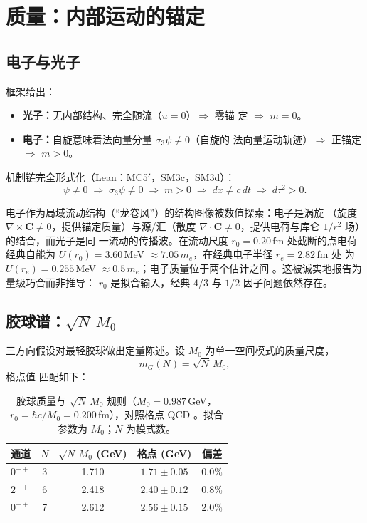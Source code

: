 \documentclass[aps,prd,preprint,superscriptaddress,amsmath,amssymb]{revtex4-2}
\begin{document}
\section{质量：内部运动的锚定}\label{sec:mass}

\subsection{电子与光子}

框架给出：
\begin{itemize}
  \item \textbf{光子：}无内部结构、完全随流（$u=0$）$\Longrightarrow$ 零锚
  定 $\Longrightarrow$ $m=0$。
  \item \textbf{电子：}自旋意味着法向量分量 $\sigma_3\psi\neq 0$（自旋的
  法向量运动轨迹）$\Longrightarrow$ 正锚定 $\Longrightarrow$ $m>0$。
\end{itemize}
机制链完全形式化（Lean：MC5$'$，SM3c，SM3d）：
\begin{equation}
\psi\neq 0 \;\Longrightarrow\; \sigma_3\psi\neq 0
\;\Longrightarrow\; m>0
\;\Longrightarrow\; dx \neq c\,dt
\;\Longrightarrow\; d\tau^2 > 0 .
\end{equation}

电子作为局域流动结构（``龙卷风''）的结构图像被数值探索：电子是涡旋
（旋度 $\nabla\times\bm{C}\neq 0$，提供锚定质量）与源/汇（散度
$\nabla\cdot\bm{C}\neq 0$，提供电荷与库仑 $1/r^2$ 场）的结合，而光子是同
一流动的传播波。在流动尺度 $r_0=0.20$\,fm 处截断的点电荷经典自能为
$U(r_0)=3.60$\,MeV $\approx 7.05\,m_e$，在经典电子半径 $r_e=2.82$\,fm 处
为 $U(r_e)=0.255$\,MeV $\approx 0.5\,m_e$；电子质量位于两个估计之间
\cite{ProjectionPhysics-electron}。这被诚实地报告为量级巧合而非推导：
$r_0$ 是拟合输入，经典 $4/3$ 与 $1/2$ 因子问题依然存在。

\subsection{胶球谱：$\sqrt{N}\,M_0$}

三方向假设对最轻胶球做出定量陈述。设 $M_0$ 为单一空间模式的质量尺度，
\begin{equation}
m_G(N) = \sqrt{N}\,M_0 ,
\end{equation}
格点值 \cite{MorningstarPeardon1999,Chen2006} 匹配如下：

\begin{table}[h]
\caption{胶球质量与 $\sqrt{N}\,M_0$ 规则（$M_0=0.987$\,GeV，
$r_0=\hbar c/M_0=0.200$\,fm），对照格点 QCD
\cite{MorningstarPeardon1999,Chen2006}。拟合参数为 $M_0$；$N$ 为模式数。}
\label{tab:glueball}
\begin{ruledtabular}
\begin{tabular}{lcccc}
通道 & $N$ & $\sqrt{N}\,M_0$ (GeV) & 格点 (GeV) & 偏差 \\
\hline
$0^{++}$ & 3 & 1.710 & $1.71\pm0.05$ & $0.0\%$ \\
$2^{++}$ & 6 & 2.418 & $2.40\pm0.12$ & $0.8\%$ \\
$0^{-+}$ & 7 & 2.612 & $2.56\pm0.15$ & $2.0\%$ \\
\end{tabular}
\end{ruledtabular}
\end{table}
\end{document}
